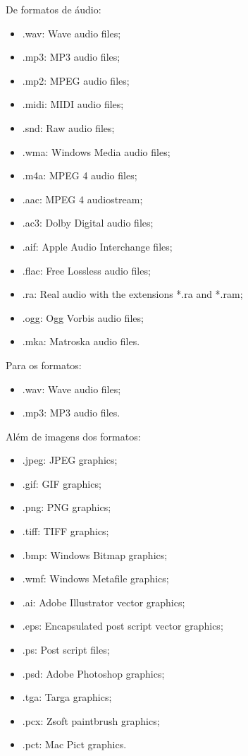 De formatos de áudio:
\begin{itemize}
    \item{.wav: Wave audio files;}
    \item{.mp3: MP3 audio files;}
    \item{.mp2: MPEG audio files;}
    \item{.midi: MIDI audio files;}
    \item{.snd: Raw audio files;}
    \item{.wma: Windows Media audio files;}
    \item{.m4a: MPEG 4 audio files;}
    \item{.aac: MPEG 4 audiostream;}
    \item{.ac3: Dolby Digital audio files;}
    \item{.aif: Apple Audio Interchange files;}
    \item{.flac: Free Lossless audio files;}
    \item{.ra: Real audio with the extensions *.ra and *.ram;}
    \item{.ogg: Ogg Vorbis audio files;}
    \item{.mka: Matroska audio files.}
\end{itemize}

Para os formatos:
\begin{itemize}
    \item{.wav: Wave audio files;}
    \item{.mp3: MP3 audio files.}
\end{itemize}


Além de imagens dos formatos:
\begin{itemize}
    \item{.jpeg: JPEG graphics;}
    \item{.gif: GIF graphics;}
    \item{.png: PNG graphics;}
    \item{.tiff: TIFF graphics;}
    \item{.bmp: Windows Bitmap graphics;}
    \item{.wmf: Windows Metafile graphics;}
    \item{.ai: Adobe Illustrator vector graphics;}
    \item{.eps: Encapsulated post script vector graphics;}
    \item{.ps: Post script files;}
    \item{.psd: Adobe Photoshop graphics;}
    \item{.tga: Targa graphics;}
    \item{.pcx: Zsoft paintbrush graphics;}
    \item{.pct: Mac Pict graphics.}
\end{itemize}

